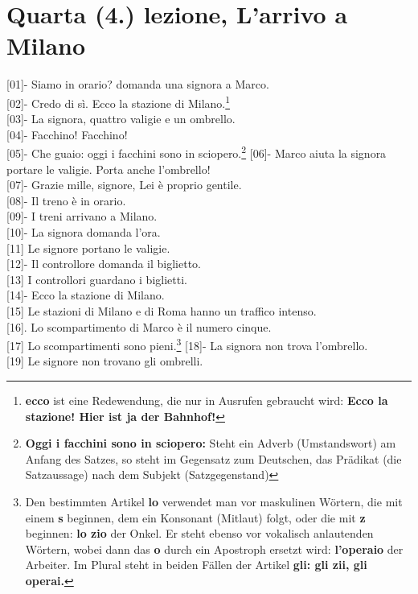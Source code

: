 \documentclass{article}
\begin{document}
\section{Quarta (4.) lezione, L'arrivo a Milano}

{[01]}- Siamo in orario? domanda una signora a Marco.\\
{[02]}- Credo di sì. Ecco la stazione di Milano.\footnote{\textbf{ecco} ist
eine Redewendung, die nur in Ausrufen gebraucht wird: \textbf{Ecco la stazione!
\glqq Hier ist ja der Bahnhof!\grqq}}\\
{[03]}- La signora, quattro valigie e un ombrello.\\
{[04]}- Facchino! Facchino!\\
{[05]}- Che guaio: oggi i facchini sono in sciopero.\footnote{\textbf{Oggi i
facchini sono in sciopero:} Steht ein Adverb (Umstandswort)
am Anfang des Satzes, so steht im Gegensatz zum Deutschen,
das Prädikat (die Satzaussage) nach dem Subjekt (Satzgegenstand) }
{[06]}- Marco aiuta la signora portare le valigie. Porta anche l'ombrello!\\
{[07]}- Grazie mille, signore, Lei è proprio gentile.\\
{[08]}- Il treno è in orario.\\
{[09]}- I treni arrivano a Milano.\\
{[10]}- La signora domanda l'ora.\\
{[11]} Le signore portano le valigie.\\
{[12]}- Il controllore domanda il biglietto.\\
{[13]} I controllori guardano i biglietti.\\
{[14]}- Ecco la stazione di Milano.\\
{[15]} Le stazioni di Milano e di Roma hanno un traffico intenso.\\
{[16]}. Lo scompartimento di Marco è il numero cinque.\\
{[17]} Lo scompartimenti sono pieni.\footnote{Den bestimmten Artikel
    \textbf{lo} verwendet man vor maskulinen Wörtern, die mit einem \textbf{s}
    beginnen, dem ein Konsonant (Mitlaut) folgt, oder die mit \textbf{z}
    beginnen: \textbf{lo zio} \glqq der Onkel\grqq. Er steht ebenso vor vokalisch
    anlautenden Wörtern, wobei dann das \textbf{o} durch ein Apostroph ersetzt
    wird: \textbf{l'operaio} \glqq der Arbeiter\grqq. Im Plural steht in beiden Fällen
    der Artikel \textbf{gli: gli zii, gli operai.}}
{[18]}- La signora non trova l'ombrello.\\
{[19]} Le signore non trovano gli ombrelli.\\
\end{document}
